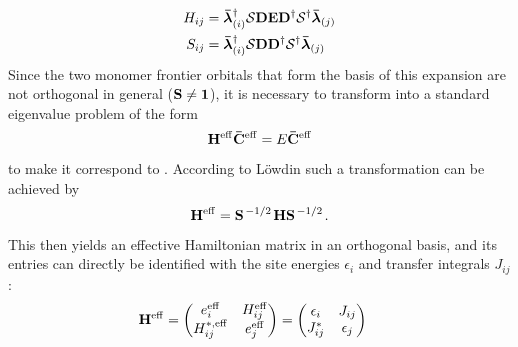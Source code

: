  \begin{equation}
  \begin{aligned}
     H_{ij} &= \mathbf{ \bar{\boldsymbol{\lambda}} }_{(i)}^\dagger \mathbf{ \mathcal{S} } \mathbf{ D } \mathbf{ E } \mathbf{ D }^\dagger \mathbf{ \mathcal{S} }^\dagger \mathbf{ \bar{\boldsymbol{\lambda}} }_{(j)}  \\
     S_{ij} &= \mathbf{ \bar{\boldsymbol{\lambda}} }_{(i)}^\dagger \mathbf{ \mathcal{S} } \mathbf{ D }  \mathbf{ D }^\dagger \mathbf{ \mathcal{S} }^\dagger \mathbf{ \bar{\boldsymbol{\lambda}} }_{(j)} 
  \end{aligned}
   \label{eq:dipro_eq20}
 \end{equation}
%
Since the two monomer frontier orbitals that form the basis of this expansion are not orthogonal in general ($\mathbf{ S } \neq \mathbf{ 1 }$), it is necessary to transform  into a standard eigenvalue problem of the form
%
\begin{equation}
  \mathbf{ H }^{\mathrm{eff}} \mathbf{ \bar{C} }^{\mathrm{eff}} =   E \mathbf{ \bar{C} }^{\mathrm{eff}} 
  \label{eq:dipro_eq7}
\end{equation}
%
to make it correspond to . According to L\"owdin such a transformation can be achieved by
%
\begin{equation}
  \mathbf{ H^\mathrm{eff} } = \mathbf{ S }^{\left. {-1} \middle/ {2} \right.}
  \mathbf{ H }\mathbf{ S }^{\left. {-1} \middle/ {2} \right.}.
  \label{eq:dipro_eq9}
\end{equation}
%
This then yields an effective Hamiltonian matrix in an orthogonal basis, and its entries can directly be identified with the site energies $\epsilon_i$ and transfer integrals $J_{ij}$:
%
\begin{equation}
 \begin{aligned}
  \mathbf{ H }^{\mathrm{eff}} &= 
    \begin{pmatrix}
      e_i^{\mathrm{eff}}    &  H_{ij}^\mathrm{eff} \\
      H_{ij}^{*,\mathrm{eff}}   &  e_j^\mathrm{eff}  
    \end{pmatrix} =
    \begin{pmatrix}
      \epsilon_i    &  J_{ij} \\
      J_{ij}^*      &  \epsilon_j  
    \end{pmatrix} 
 \end{aligned}
  \label{eq:dipro_eq11}
\end{equation}

